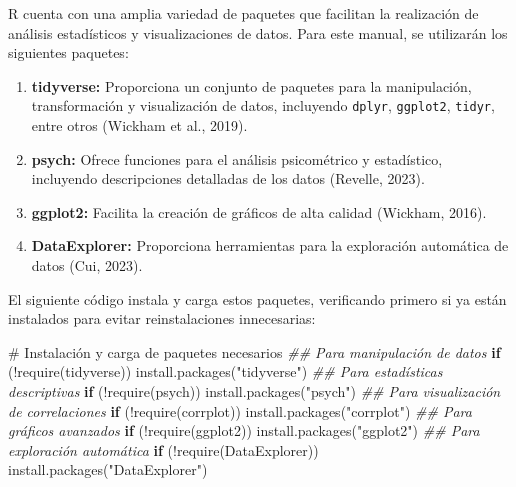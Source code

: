 \documentclass[
  spanish,
  a4paper,
  DIV=11,
  numbers=noendperiod,
  onepage,
  openany]{scrreprt}
\newenvironment{Shaded}{\begin{snugshade}}{\end{snugshade}}
\newcommand{\CommentTok}[1]{\textcolor[rgb]{0.37,0.37,0.37}{#1}}
\newcommand{\ControlFlowTok}[1]{\textcolor[rgb]{0.00,0.23,0.31}{\textbf{#1}}}
\newcommand{\DocumentationTok}[1]{\textcolor[rgb]{0.37,0.37,0.37}{\textit{#1}}}
\newcommand{\FunctionTok}[1]{\textcolor[rgb]{0.28,0.35,0.67}{#1}}
\newcommand{\NormalTok}[1]{\textcolor[rgb]{0.00,0.23,0.31}{#1}}
\newcommand{\SpecialCharTok}[1]{\textcolor[rgb]{0.37,0.37,0.37}{#1}}
\newcommand{\StringTok}[1]{\textcolor[rgb]{0.13,0.47,0.30}{#1}}
\begin{document}
R cuenta con una amplia variedad de paquetes que facilitan la
realización de análisis estadísticos y visualizaciones de datos. Para
este manual, se utilizarán los siguientes paquetes:

\begin{enumerate}
\def\labelenumi{\arabic{enumi}.}
\item
  \textbf{tidyverse:} Proporciona un conjunto de paquetes para la
  manipulación, transformación y visualización de datos, incluyendo
  \texttt{dplyr}, \texttt{ggplot2}, \texttt{tidyr}, entre otros (Wickham
  et al., 2019).
\item
  \textbf{psych:} Ofrece funciones para el análisis psicométrico y
  estadístico, incluyendo descripciones detalladas de los datos
  (Revelle, 2023).
\item
  \textbf{ggplot2:} Facilita la creación de gráficos de alta calidad
  (Wickham, 2016).
\item
  \textbf{DataExplorer:} Proporciona herramientas para la exploración
  automática de datos (Cui, 2023).
\end{enumerate}

El siguiente código instala y carga estos paquetes, verificando primero
si ya están instalados para evitar reinstalaciones innecesarias:

\begin{Shaded}
\begin{Highlighting}[]
\CommentTok{\# Instalación y carga de paquetes necesarios}
\DocumentationTok{\#\# Para manipulación de datos}
\ControlFlowTok{if}\NormalTok{ (}\SpecialCharTok{!}\FunctionTok{require}\NormalTok{(tidyverse)) }\FunctionTok{install.packages}\NormalTok{(}\StringTok{"tidyverse"}\NormalTok{)  }
\DocumentationTok{\#\# Para estadísticas descriptivas}
\ControlFlowTok{if}\NormalTok{ (}\SpecialCharTok{!}\FunctionTok{require}\NormalTok{(psych)) }\FunctionTok{install.packages}\NormalTok{(}\StringTok{"psych"}\NormalTok{)         }
\DocumentationTok{\#\# Para visualización de correlaciones}
\ControlFlowTok{if}\NormalTok{ (}\SpecialCharTok{!}\FunctionTok{require}\NormalTok{(corrplot)) }\FunctionTok{install.packages}\NormalTok{(}\StringTok{"corrplot"}\NormalTok{)    }
\DocumentationTok{\#\# Para gráficos avanzados}
\ControlFlowTok{if}\NormalTok{ (}\SpecialCharTok{!}\FunctionTok{require}\NormalTok{(ggplot2)) }\FunctionTok{install.packages}\NormalTok{(}\StringTok{"ggplot2"}\NormalTok{)      }
\DocumentationTok{\#\# Para exploración automática}
\ControlFlowTok{if}\NormalTok{ (}\SpecialCharTok{!}\FunctionTok{require}\NormalTok{(DataExplorer)) }\FunctionTok{install.packages}\NormalTok{(}\StringTok{"DataExplorer"}\NormalTok{)  }
\end{Highlighting}
\end{Shaded}
\end{document}
